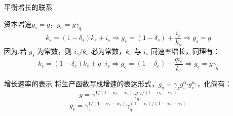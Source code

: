 \documentclass[aspectratio=169,10pt]{beamer}
\begin{document}
\begin{frame}{平衡增长的联系}
  \small
  \begin{block}{资本增速$g_s = g$，$g_e = g\gamma_q$}
    \begin{equation*}
      k_s = (1-\delta_s)k_s + i_s \Rightarrow g_s = (1-\delta_s) + \dfrac{i_s}{k_s} \Rightarrow g_s = g
    \end{equation*}
    因为,若 $g_s$ 为常数，则 $i_s/k_s$ 必为常数，$k_s$ 与 $i_s$ 同速率增长，同理有：
    \begin{equation*}
      k_e = (1-\delta_e)k_e + q\cdot i_e \Rightarrow  g_e = (1-\delta_e) + \dfrac{q i_e}{k_e} \Rightarrow g_e = g \gamma_q
    \end{equation*}
  \end{block}

  \begin{block}{增长速率的表示}
    将生产函数写成增速的表达形式，$g_y = \gamma_z g_s^{\alpha_s} g_e^{\alpha_e}$，化简有：
    \begin{equation*}
      g = \gamma_z^{1/(1-\alpha_e - \alpha_s)} \gamma_q^{\alpha_e/(1-\alpha_e - \alpha_s)}
    \end{equation*}
    \begin{equation*}
      g_e = \gamma_z^{1/(1-\alpha_e - \alpha_s)} \gamma_q^{(1-\alpha_s)/(1-\alpha_e - \alpha_s)}
    \end{equation*}
  \end{block}

\end{frame}


\end{document}

